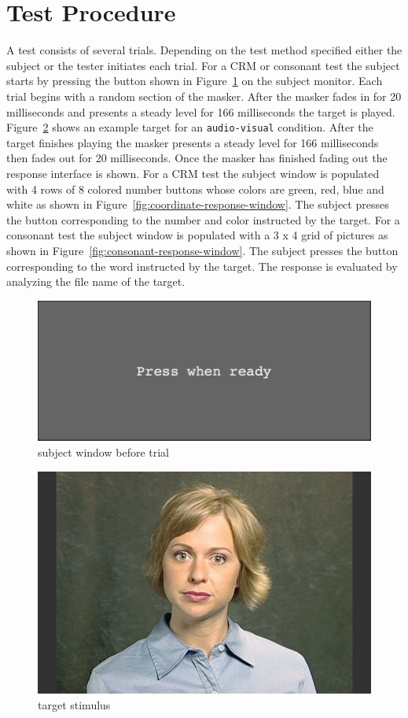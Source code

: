 \documentclass[11pt,pdftex,letterpaper]{article}
\begin{document}
\section{Test Procedure}
A test consists of several trials. Depending on the test method specified either the subject or the tester initiates each trial. For a CRM or consonant test the subject starts by pressing the button shown in Figure~\ref{fig:subject-ready-window} on the subject monitor. Each trial begins with a random section of the masker. After the masker fades in for 20 milliseconds and presents a steady level for 166 milliseconds the target is played. Figure~\ref{fig:target-stimulus} shows an example target for an \texttt{audio-visual} condition. After the target finishes playing the masker presents a steady level for 166 milliseconds then fades out for 20 milliseconds. Once the masker has finished fading out the response interface is shown. For a CRM test the subject window is populated with 4 rows of 8 colored number buttons whose colors are green, red, blue and white as shown in Figure~\ref{fig:coordinate-response-window}. The subject presses the button corresponding to the number and color instructed by the target. For a consonant test the subject window is populated with a 3 x 4 grid of pictures as shown in Figure~\ref{fig:consonant-response-window}. The subject presses the button corresponding to the word instructed by the target. The response is evaluated by analyzing the file name of the target.

\begin{figure}
\centering
\includegraphics[width = 0.9\linewidth]{subject-ready-window.png}
\caption{subject window before trial}
\label{fig:subject-ready-window}
\end{figure}

\begin{figure}
\centering
\includegraphics[width = 0.9\linewidth]{target-stimulus.png}
\caption{target stimulus}
\label{fig:target-stimulus}
\end{figure}
\end{document}
